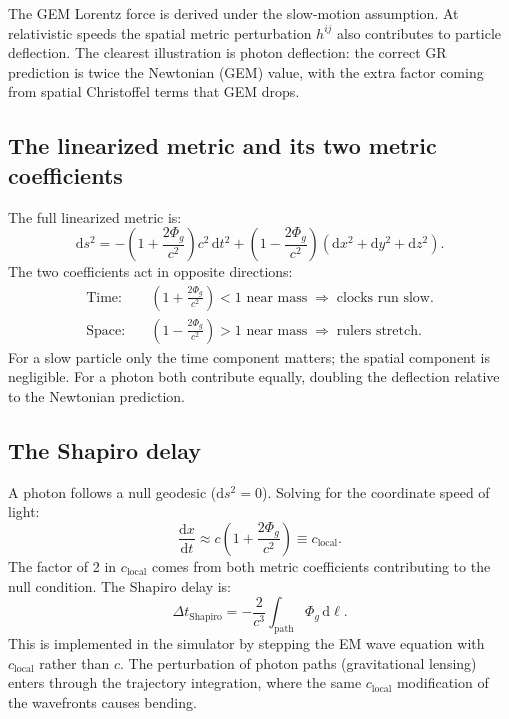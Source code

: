 \documentclass[11pt,a4paper]{article}
\newcommand{\Phig}{\Phi_g}
\newcommand{\dd}{\mathrm{d}}
\begin{document}
The GEM Lorentz force is derived under the slow-motion assumption.  At relativistic speeds the spatial metric perturbation $h^{ij}$ also contributes to particle deflection.  The clearest illustration is photon deflection: the correct GR prediction is twice the Newtonian (GEM) value, with the extra factor coming from spatial Christoffel terms that GEM drops.

\subsection{The linearized metric and its two metric coefficients}

The full linearized metric is:
\begin{equation}
  \dd s^2 = -\!\left(1+\frac{2\Phig}{c^2}\right)c^2\,\dd t^2
            + \left(1-\frac{2\Phig}{c^2}\right)\!\left(\dd x^2+\dd y^2+\dd z^2\right).
\end{equation}
The two coefficients act in opposite directions:
\begin{align}
  \text{Time:}  &\quad \left(1+\frac{2\Phig}{c^2}\right) < 1 \text{ near mass} \;\Rightarrow\; \text{clocks run slow.} \\
  \text{Space:} &\quad \left(1-\frac{2\Phig}{c^2}\right) > 1 \text{ near mass} \;\Rightarrow\; \text{rulers stretch.}
\end{align}
For a slow particle only the time component matters; the spatial component is negligible.  For a photon both contribute equally, doubling the deflection relative to the Newtonian prediction.

\subsection{The Shapiro delay}
\label{sec:shapiro}

A photon follows a null geodesic ($\dd s^2=0$).  Solving for the coordinate speed of light:
\begin{equation}
  \label{eq:c_local}
  \frac{\dd x}{\dd t} \approx c\!\left(1 + \frac{2\Phig}{c^2}\right) \equiv c_{\mathrm{local}}.
\end{equation}
The factor of 2 in $c_{\mathrm{local}}$ comes from both metric coefficients contributing to the null condition.  The Shapiro delay is:
\begin{equation}
  \label{eq:shapiro_delay}
  \Delta t_{\mathrm{Shapiro}} = -\frac{2}{c^3}\int_{\mathrm{path}}\Phig\,\dd\ell.
\end{equation}
This is implemented in the simulator by stepping the EM wave equation with $c_{\mathrm{local}}$ rather than $c$.  The perturbation of photon paths (gravitational lensing) enters through the trajectory integration, where the same $c_{\mathrm{local}}$ modification of the wavefronts causes bending.
\end{document}
